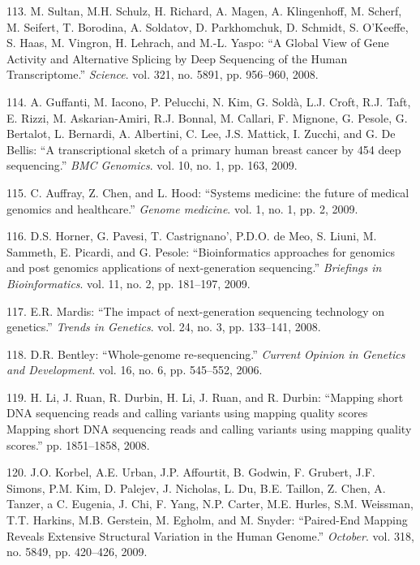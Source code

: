 \documentclass[12pt,twoside]{reedthesis}
\theoremstyle{definition}
\theoremstyle{definition}
\theoremstyle{remark}
\begin{document}
  \hypertarget{ref-Sultan2008}{}
  113. M. Sultan, M.H. Schulz, H. Richard, A. Magen, A. Klingenhoff, M.
  Scherf, M. Seifert, T. Borodina, A. Soldatov, D. Parkhomchuk, D.
  Schmidt, S. O'Keeffe, S. Haas, M. Vingron, H. Lehrach, and M.-L. Yaspo:
  ``A Global View of Gene Activity and Alternative Splicing by Deep
  Sequencing of the Human Transcriptome.'' \emph{Science}. vol. 321, no.
  5891, pp. 956--960, 2008.
  
  \hypertarget{ref-Guffanti2009}{}
  114. A. Guffanti, M. Iacono, P. Pelucchi, N. Kim, G. Soldà, L.J. Croft,
  R.J. Taft, E. Rizzi, M. Askarian-Amiri, R.J. Bonnal, M. Callari, F.
  Mignone, G. Pesole, G. Bertalot, L. Bernardi, A. Albertini, C. Lee, J.S.
  Mattick, I. Zucchi, and G. De Bellis: ``A transcriptional sketch of a
  primary human breast cancer by 454 deep sequencing.'' \emph{BMC
  Genomics}. vol. 10, no. 1, pp. 163, 2009.
  
  \hypertarget{ref-Auffray2009}{}
  115. C. Auffray, Z. Chen, and L. Hood: ``Systems medicine: the future of
  medical genomics and healthcare.'' \emph{Genome medicine}. vol. 1, no.
  1, pp. 2, 2009.
  
  \hypertarget{ref-Horner2009}{}
  116. D.S. Horner, G. Pavesi, T. Castrignano', P.D.O. de Meo, S. Liuni,
  M. Sammeth, E. Picardi, and G. Pesole: ``Bioinformatics approaches for
  genomics and post genomics applications of next-generation sequencing.''
  \emph{Briefings in Bioinformatics}. vol. 11, no. 2, pp. 181--197, 2009.
  
  \hypertarget{ref-Mardis2008}{}
  117. E.R. Mardis: ``The impact of next-generation sequencing technology
  on genetics.'' \emph{Trends in Genetics}. vol. 24, no. 3, pp. 133--141,
  2008.
  
  \hypertarget{ref-Bentley2006}{}
  118. D.R. Bentley: ``Whole-genome re-sequencing.'' \emph{Current Opinion
  in Genetics and Development}. vol. 16, no. 6, pp. 545--552, 2006.
  
  \hypertarget{ref-Li2008}{}
  119. H. Li, J. Ruan, R. Durbin, H. Li, J. Ruan, and R. Durbin: ``Mapping
  short DNA sequencing reads and calling variants using mapping quality
  scores Mapping short DNA sequencing reads and calling variants using
  mapping quality scores.'' pp. 1851--1858, 2008.
  
  \hypertarget{ref-Korbel2009}{}
  120. J.O. Korbel, A.E. Urban, J.P. Affourtit, B. Godwin, F. Grubert,
  J.F. Simons, P.M. Kim, D. Palejev, J. Nicholas, L. Du, B.E. Taillon, Z.
  Chen, A. Tanzer, a C. Eugenia, J. Chi, F. Yang, N.P. Carter, M.E.
  Hurles, S.M. Weissman, T.T. Harkins, M.B. Gerstein, M. Egholm, and M.
  Snyder: ``Paired-End Mapping Reveals Extensive Structural Variation in
  the Human Genome.'' \emph{October}. vol. 318, no. 5849, pp. 420--426,
  2009.
  
\end{document}

